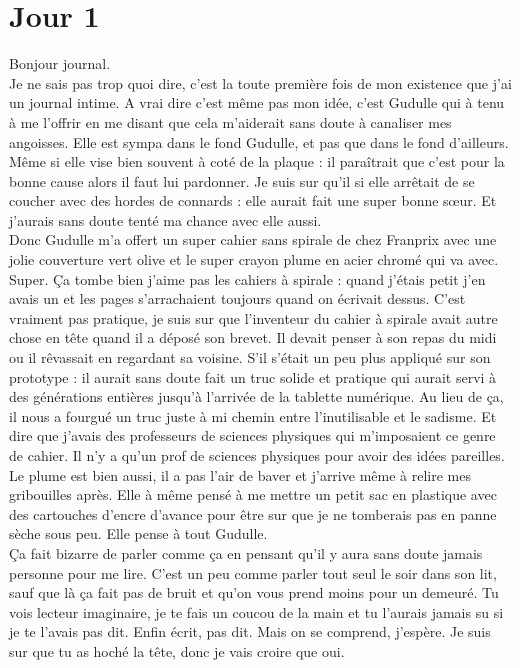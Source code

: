 \chapter*{Jour 1}
Bonjour journal.\\

Je ne sais pas trop quoi dire, c'est la toute première fois de mon existence que j'ai un journal intime. A vrai dire c'est même pas mon idée, c'est Gudulle qui à tenu à me l'offrir en me disant que cela m'aiderait sans doute à canaliser mes angoisses. Elle est sympa dans le fond Gudulle, et pas que dans le fond d'ailleurs. Même si elle vise bien souvent à coté de la plaque : il paraîtrait que c'est pour la bonne cause alors il faut lui pardonner. Je suis sur qu'il si elle arrêtait de se coucher avec des hordes de connards : elle aurait fait une super bonne sœur. Et j'aurais sans doute tenté ma chance avec elle aussi. \\

Donc Gudulle m'a offert un super cahier sans spirale de chez Franprix avec une jolie couverture vert olive et le super crayon plume en acier chromé qui va avec. Super. Ça tombe bien j'aime pas les cahiers à spirale : quand j'étais petit j'en avais un et les pages s'arrachaient toujours quand on écrivait dessus. C'est vraiment pas pratique, je suis sur que l'inventeur du cahier à spirale avait autre chose en tête quand il a déposé son brevet. Il devait penser à son repas du midi ou il rêvassait en regardant sa voisine. S'il s'était un peu plus appliqué sur son prototype : il aurait sans doute fait un truc solide et pratique qui aurait servi à des générations entières jusqu’à l'arrivée de la tablette numérique. Au lieu de ça, il nous a fourgué un truc juste à mi chemin entre l'inutilisable et le sadisme. Et dire que j'avais des professeurs de sciences physiques qui m'imposaient ce genre de cahier. Il n'y a qu'un prof de sciences physiques pour avoir des idées pareilles.\\

Le plume est bien aussi, il a pas l'air de baver et j'arrive même à relire mes gribouilles après. Elle à même pensé à me mettre un petit sac en plastique avec des cartouches d'encre d'avance pour être sur que je ne tomberais pas en panne sèche sous peu. Elle pense à tout Gudulle. \\

Ça fait bizarre de parler comme ça en pensant qu'il y aura sans doute jamais personne pour me lire. C'est un peu comme parler tout seul le soir dans son lit, sauf que là ça fait pas de bruit et qu'on vous prend moins pour un demeuré. Tu vois lecteur imaginaire, je te fais un coucou de la main et tu l'aurais jamais su si je te l'avais pas dit. Enfin écrit, pas dit. Mais on se comprend, j'espère. Je suis sur que tu as hoché la tête, donc je vais croire que oui.\\

